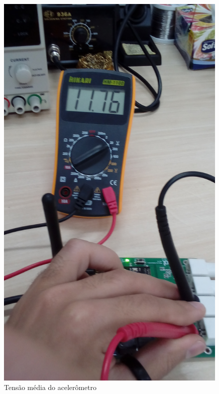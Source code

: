 \documentclass[
	12pt,				%
	openright,			%
	twoside,			%
	a4paper,			%
	english,			%
	french,				%
	spanish,			%
	brazil,				%
	]{abntex2}
\begin{document}
			\begin{figure}[!ht]
				\centering
				\begin{minipage}{0.4\linewidth}
					\centering
					\includegraphics[angle=-90,width = \linewidth]{../Fotos/tensaoAcc.jpg}
					\caption{Tensão média do acelerômetro}
				\end{minipage}
				\hfill\vline\hfill
				\begin{minipage}{0.4\linewidth}
					\centering

\end{minipage}
\end{figure}
\end{document}
